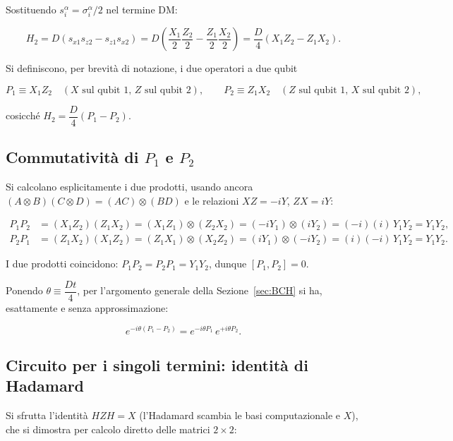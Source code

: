 \documentclass[11pt,a4paper]{article}
\begin{document}
Sostituendo $s_i^\alpha=\sigma_i^\alpha/2$ nel termine DM:

\begin{equation}
H_2 = D(s_{x1}s_{z2}-s_{z1}s_{x2}) = D\left(\frac{X_1}{2}\frac{Z_2}{2} - \frac{Z_1}{2}\frac{X_2}{2}\right) = \frac{D}{4}\left(X_1Z_2 - Z_1X_2\right).
\end{equation}

Si definiscono, per brevità di notazione, i due operatori a due qubit

\begin{equation}
P_1 \equiv X_1Z_2 \quad(\text{$X$ sul qubit 1, $Z$ sul qubit 2}), \qquad P_2 \equiv Z_1X_2 \quad(\text{$Z$ sul qubit 1, $X$ sul qubit 2}),
\end{equation}

cosicché $H_2 = \dfrac{D}{4}(P_1-P_2)$.

\subsection{Commutatività di $P_1$ e $P_2$}

Si calcolano esplicitamente i due prodotti, usando ancora $(A\otimes B)(C\otimes D)=(AC)\otimes(BD)$ e le relazioni $XZ=-iY$, $ZX=iY$:

\begin{align}
P_1P_2 &= (X_1Z_2)(Z_1X_2) = (X_1Z_1)\otimes(Z_2X_2) = (-iY_1)\otimes(iY_2) = (-i)(i)\,Y_1Y_2 = Y_1Y_2,\\
P_2P_1 &= (Z_1X_2)(X_1Z_2) = (Z_1X_1)\otimes(X_2Z_2) = (iY_1)\otimes(-iY_2) = (i)(-i)\,Y_1Y_2 = Y_1Y_2.
\end{align}

I due prodotti coincidono: $P_1P_2 = P_2P_1 = Y_1Y_2$, dunque $[P_1,P_2]=0$.

Ponendo $\theta \equiv \dfrac{Dt}{4}$, per l'argomento generale della Sezione~\ref{sec:BCH} si ha, esattamente e senza approssimazione:

\begin{equation}
e^{-i\theta(P_1-P_2)} = e^{-i\theta P_1}\,e^{+i\theta P_2}.
\label{eq:U2-factorized}
\end{equation}

\subsection{Circuito per i singoli termini: identità di Hadamard}

Si sfrutta l'identità $HZH=X$ (l'Hadamard scambia le basi computazionale e $X$), che si dimostra per calcolo diretto delle matrici $2\times2$:
\end{document}
